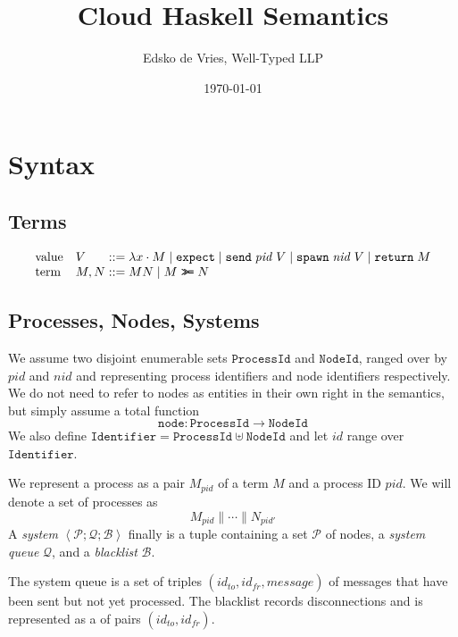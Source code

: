 \documentclass{article}
\newcommand{\sLam}[2]{\lambda {#1} \cdot {#2}}
\newcommand{\sApp}[2]{{#1} {#2}}
\newcommand{\sBind}[2]{{#1} \mathrel{\texttt{>}\!\!\texttt{>}\!\texttt{=}} {#2}}
\newcommand{\sReturn}{\mathtt{return}}
\newcommand{\sExpect}{\mathtt{expect}}
\newcommand{\sSend}{\mathtt{send}}
\newcommand{\sSpawn}{\mathtt{spawn}}
\newcommand{\sPar}{\mathrel{\parallel}}
\newcommand{\sProc}[2]{{#1}_{#2}}
\newcommand{\sPid}{\ensuremath{\mathit{pid}}}
\newcommand{\sNid}{\ensuremath{\mathit{nid}}}
\newcommand{\sId}{\ensuremath{\mathit{id}}}
\newcommand{\sSystem}[3]{\left\langle #1 ; #2 ; #3 \right\rangle}
\newcommand{\sQueue}{\mathcal{Q}}
\newcommand{\sProcesses}{\mathcal{P}}
\newcommand{\sBlacklist}{\mathcal{B}}
\newcommand{\OR}{\mathrel{|}}
\begin{document}
\title{Cloud Haskell Semantics}
\author{Edsko de Vries, Well-Typed LLP}
\date{\today}

\maketitle

\section{Syntax}

\subsection{Terms}

\begin{equation*}
\begin{array}{ll@{\;::=\;}l}
\text{value} & V    & \sLam{x}{M} \OR
                      \sExpect \OR
                      \sSend \; \sPid \; V \OR
                      \sSpawn \; \sNid \; V \OR 
                      \sReturn \; M
\\
\text{term}  & M, N & \sApp{M}{N} \OR
                      \sBind{M}{N}
\end{array}
\end{equation*}

\subsection{Processes, Nodes, Systems}

We assume two disjoint enumerable sets $\mathtt{ProcessId}$ and
$\mathtt{NodeId}$, ranged over by $\sPid$ and $\sNid$ and representing process
identifiers and node identifiers respectively. We do not need to refer to nodes
as entities in their own right in the semantics, but simply assume a total
function $$\mathtt{node} : \mathtt{ProcessId} \rightarrow \mathtt{NodeId}$$ We
also define $\mathtt{Identifier} = \mathtt{ProcessId} \uplus \mathtt{NodeId}$
and let $\sId$ range over $\mathtt{Identifier}$. 

We represent a process as a pair $\sProc{M}{\sPid}$ of a term $M$ and a process
ID $\sPid$. We will denote a set of processes as
%
  $$\sProc{M}{\sPid} \sPar \cdots \sPar \sProc{N}{\sPid'}$$
%
A \emph{system} 
  $\sSystem{\sProcesses}{\sQueue}{\sBlacklist}$ 
finally is a tuple containing a set $\sProcesses$ of nodes,
a \emph{system queue} $\sQueue$, and a \emph{blacklist} $\sBlacklist$.

The system queue is a set of triples $(\sId_\mathit{to}, \sId_\mathit{fr},
\mathit{message})$ of messages that have been sent but not yet processed. The
blacklist records disconnections and is represented as a of pairs
$(\sId_\mathit{to}, \sId_\mathit{fr})$. 
\end{document}
